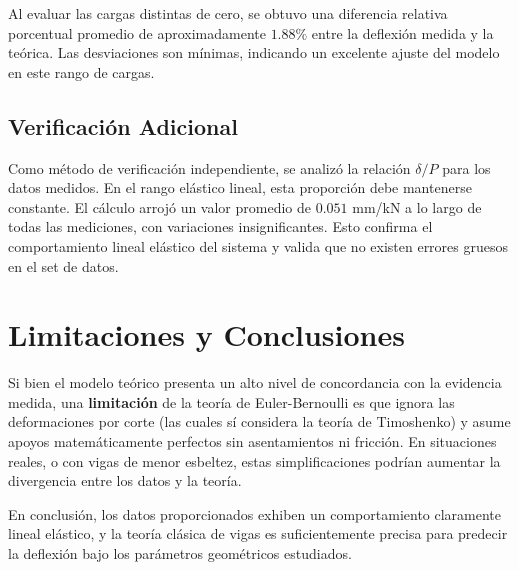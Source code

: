 \documentclass[11pt, letterpaper]{article}
\begin{document}
Al evaluar las cargas distintas de cero, se obtuvo una diferencia relativa porcentual promedio de aproximadamente $1.88\%$ entre la deflexión medida y la teórica. Las desviaciones son mínimas, indicando un excelente ajuste del modelo en este rango de cargas.

\subsection{Verificación Adicional}
Como método de verificación independiente, se analizó la relación $\delta/P$ para los datos medidos. En el rango elástico lineal, esta proporción debe mantenerse constante. El cálculo arrojó un valor promedio de $0.051$ mm/kN a lo largo de todas las mediciones, con variaciones insignificantes. Esto confirma el comportamiento lineal elástico del sistema y valida que no existen errores gruesos en el set de datos.

\section{Limitaciones y Conclusiones}
Si bien el modelo teórico presenta un alto nivel de concordancia con la evidencia medida, una \textbf{limitación} de la teoría de Euler-Bernoulli es que ignora las deformaciones por corte (las cuales sí considera la teoría de Timoshenko) y asume apoyos matemáticamente perfectos sin asentamientos ni fricción. En situaciones reales, o con vigas de menor esbeltez, estas simplificaciones podrían aumentar la divergencia entre los datos y la teoría.

En conclusión, los datos proporcionados exhiben un comportamiento claramente lineal elástico, y la teoría clásica de vigas es suficientemente precisa para predecir la deflexión bajo los parámetros geométricos estudiados.



\end{document}
